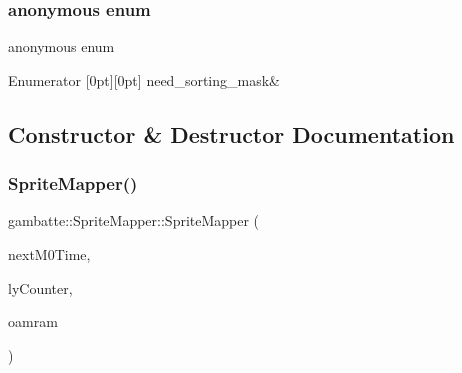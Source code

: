 \subsubsection{\texorpdfstring{anonymous enum}{anonymous enum}}
{\footnotesize\ttfamily anonymous enum\hspace{0.3cm}{\ttfamily [private]}}

\begin{DoxyEnumFields}{Enumerator}
[0pt][0pt]{}\mbox{\label{classgambatte_1_1SpriteMapper_a523804247b052cc0c961255e4dd20ce8af390b53d20749943c37e1f9c84a9a01e}} 
need\+\_\+sorting\+\_\+mask&\\
\hline

\end{DoxyEnumFields}


\subsection{Constructor \& Destructor Documentation}
\mbox{\label{classgambatte_1_1SpriteMapper_afa54d28e21f1ff73031a387fb8aefdce}} 
\subsubsection{\texorpdfstring{Sprite\+Mapper()}{SpriteMapper()}}
{\footnotesize\ttfamily gambatte\+::\+Sprite\+Mapper\+::\+Sprite\+Mapper (\begin{DoxyParamCaption}\item[{\hyperlink{classgambatte_1_1NextM0Time}{Next\+M0\+Time} \&}]{next\+M0\+Time,  }\item[{\hyperlink{classgambatte_1_1LyCounter}{Ly\+Counter} const \&}]{ly\+Counter,  }\item[{unsigned char const $\ast$}]{oamram }\end{DoxyParamCaption})}



